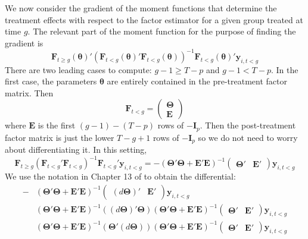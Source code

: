 \documentclass[12pt]{article}
\begin{document}
We now consider the gradient of the moment functions that determine the treatment effects with respect to the factor estimator for a given group treated at time $g$. The relevant part of the moment function for the purpose of finding the gradient is 
\begin{equation}
    \bm F_{t \geq g}(\bm \theta)' \left( \bm F_{t < g}(\bm \theta)' \bm F_{t < g}(\bm \theta) \right)^{-1} \bm F_{t < g}(\bm \theta)' \bm y_{i,t < g}
\end{equation}
There are two leading cases to compute: $g - 1 \geq T - p$ and $g - 1 < T - p$. In the first case, the parameters $\bm \theta$ are entirely contained in the pre-treatment factor matrix. Then 
\begin{equation}
    \bm F_{t < g} = 
    \begin{pmatrix}
        \bm \Theta\\
        \bm E
    \end{pmatrix}
\end{equation}
where $\bm E$ is the first $(g - 1) - (T - p)$ rows of $- \bm I_p$. Then the post-treatment factor matrix is just the lower $T - g + 1$ rows of $- \bm I_p$ so we do not need to worry about differentiating it. In this setting,
\begin{equation}
    \bm F_{t \geq g} \left( \bm F_{t < g}' \bm F_{t < g} \right)^{-1} \bm F_{t < g}' \bm y_{i,t < g} = - \left( \bm \Theta' \bm \Theta + \bm E' \bm E \right)^{-1} 
    \begin{pmatrix}
        \bm \Theta' & \bm E'
    \end{pmatrix}
    \bm y_{i,t < g}
\end{equation}
We use the notation in Chapter 13 of \citet{abadir2005matrix} to obtain the differential: 
\begin{align}
   - &
   \left( \bm \Theta' \bm \Theta + \bm E' \bm E \right)^{-1} 
    \begin{pmatrix}
        (d \bm \Theta)' & \bm E'
    \end{pmatrix}
    \bm y_{i,t < g}\\ 
    &
    \left( \bm \Theta' \bm \Theta + \bm E' \bm E \right)^{-1} \left( (d \bm \Theta)' \bm \Theta  \right) \left( \bm \Theta' \bm \Theta + \bm E' \bm E \right)^{-1}
    \begin{pmatrix}
        \bm \Theta' & \bm E'
    \end{pmatrix}
    \bm y_{i,t < g} \\
    &
    \left( \bm \Theta' \bm \Theta + \bm E' \bm E \right)^{-1} \left( \bm \Theta' (d \bm \Theta)  \right) \left( \bm \Theta' \bm \Theta + \bm E' \bm E \right)^{-1}
    \begin{pmatrix}
        \bm \Theta' & \bm E'
    \end{pmatrix}
    \bm y_{i,t < g} 
\end{align}
\end{document}
